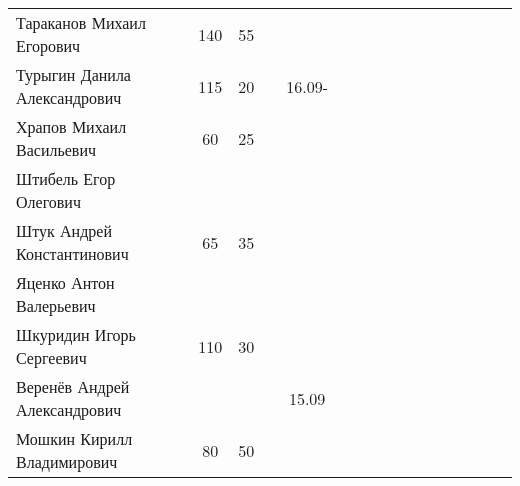 \documentclass[a4paper,11pt]{article}
\begin{document}
\begin{tabular}{l|ccccccccccccccc}
Тараканов Михаил Егорович	&140&55&&       &\\	
Турыгин Данила Александрович	&115&20&&16.09- &\\
Храпов Михаил Васильевич	&60&25 &&       &\\	
\midrule                                    
Штибель Егор Олегович		&  &   &&       &\\
Штук Андрей Константинович	&65&35 &&       &\\	
Яценко Антон Валерьевич		&  &   &&       &\\
Шкуридин Игорь Сергеевич	&110&30&&       &\\	
Веренёв Андрей Александрович	&  &   &&15.09  &\\
Мошкин Кирилл Владимирович	&80&50 &&       &\\	
\bottomrule
\end{tabular}
\end{document}
